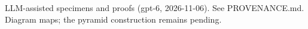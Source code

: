 \documentclass[11pt]{article}
\begin{document}

\bigskip
{\footnotesize LLM-assisted specimens and proofs (gpt-6, 2026-11-06).
See PROVENANCE.md. Diagram maps; the pyramid construction remains pending.}
\end{document}
